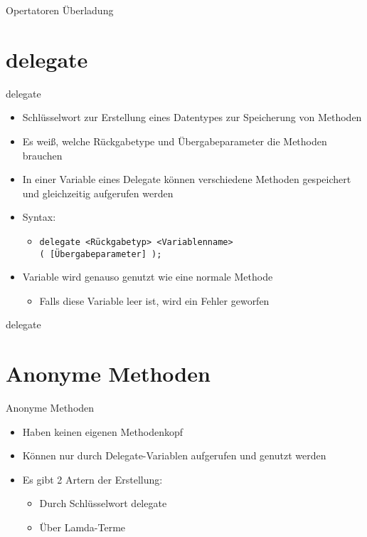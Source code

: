 \begin{frame}{Opertatoren Überladung}
	
	
\end{frame}

\section{delegate}
\begin{frame}{delegate}
	\begin{itemize}
		\item Schlüsselwort zur Erstellung eines Datentypes zur Speicherung von Methoden
		\item Es weiß, welche Rückgabetype und Übergabeparameter die Methoden brauchen
		\item In einer Variable eines Delegate können verschiedene Methoden gespeichert und gleichzeitig aufgerufen werden
		\item Syntax:
		\begin{itemize}
			\item \texttt{delegate \alert{<Rückgabetyp> <Variablenname>}\\( \alert{[Übergabeparameter]} );}
		\end{itemize}
		\item Variable wird genauso genutzt wie eine normale Methode
		\begin{itemize}
			\item Falls diese Variable leer ist, wird ein Fehler geworfen
		\end{itemize}
	\end{itemize}
\end{frame}

\begin{frame}{delegate}
	
	
\end{frame}

\section{Anonyme Methoden}
\begin{frame}{Anonyme Methoden}
	\begin{itemize}
		\item Haben keinen eigenen Methodenkopf
		\item Können nur durch Delegate-Variablen aufgerufen und genutzt werden
		\item Es gibt 2 Artern der Erstellung:
		\begin{itemize}
			\item Durch Schlüsselwort \alert{delegate}
			\item Über Lamda-Terme
		\end{itemize}	
	\end{itemize}
\end{frame}


